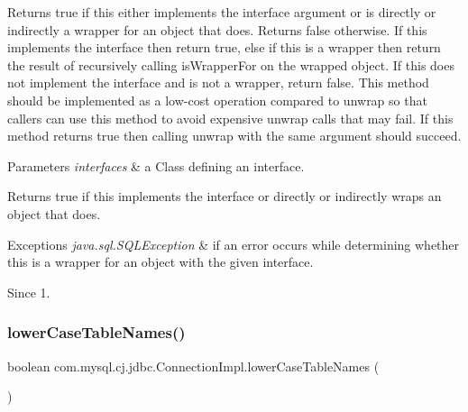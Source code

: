 Returns true if this either implements the interface argument or is directly or indirectly a wrapper for an object that does. Returns false otherwise. If this implements the interface then return true, else if this is a wrapper then return the result of recursively calling {\ttfamily is\+Wrapper\+For} on the wrapped object. If this does not implement the interface and is not a wrapper, return false. This method should be implemented as a low-\/cost operation compared to {\ttfamily unwrap} so that callers can use this method to avoid expensive {\ttfamily unwrap} calls that may fail. If this method returns true then calling {\ttfamily unwrap} with the same argument should succeed.


\begin{DoxyParams}{Parameters}
{\em interfaces} & a Class defining an interface. \\
\hline
\end{DoxyParams}
\begin{DoxyReturn}{Returns}
true if this implements the interface or directly or indirectly wraps an object that does. 
\end{DoxyReturn}

\begin{DoxyExceptions}{Exceptions}
{\em java.\+sql.\+S\+Q\+L\+Exception} & if an error occurs while determining whether this is a wrapper for an object with the given interface. \\
\hline
\end{DoxyExceptions}
\begin{DoxySince}{Since}
1. 
\end{DoxySince}
\mbox{\label{classcom_1_1mysql_1_1cj_1_1jdbc_1_1_connection_impl_a75475406eba7048aeb899c27d04f2c59}} 
\subsubsection{\texorpdfstring{lower\+Case\+Table\+Names()}{lowerCaseTableNames()}}
{\footnotesize\ttfamily boolean com.\+mysql.\+cj.\+jdbc.\+Connection\+Impl.\+lower\+Case\+Table\+Names (\begin{DoxyParamCaption}{ }\end{DoxyParamCaption})}

